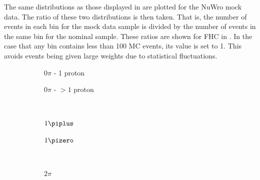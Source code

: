 The same distributions as those displayed in  are plotted for the NuWro mock data.
The ratio of these two distributions is then taken.
That is, the number of events in each bin for the mock data sample is divided by the number of events in the same bin for the nominal sample.
These ratios are shown for FHC in .
In the case that any bin contains less than \num{100} MC events, its value is set to 1.
This avoids events being given large weights due to statistical fluctuations.

\begin{figure}[t]
	\begin{subfigure}[t]{.5\linewidth}
		\begin{adjustbox}{max totalsize=\linewidth, center}
			
		\end{adjustbox}
		\caption{$0\pi$ - 1 proton}
	\end{subfigure}
	\hfill
	\begin{subfigure}[t]{.5\linewidth}
		\begin{adjustbox}{max totalsize=\linewidth, center}
			
		\end{adjustbox}
		\caption{$0\pi$ - $>1$ proton}
	\end{subfigure} \\
	\begin{subfigure}[t]{.5\linewidth}
		\begin{adjustbox}{max totalsize=\linewidth, center}
			
		\end{adjustbox}
		\caption{$1\piplus$}
	\end{subfigure}
	\hfill
	\begin{subfigure}[t]{.5\linewidth}
		\begin{adjustbox}{max totalsize=\linewidth, center}
			
		\end{adjustbox}
		\caption{$1\pizero$}
	\end{subfigure} \\
	\begin{subfigure}[t]{.5\linewidth}
		\begin{adjustbox}{max totalsize=\linewidth, center}
			
		\end{adjustbox}
		\caption{$2\pi$}
	\end{subfigure}
	\hfill
	\begin{subfigure}[t]{.5\linewidth}

\end{subfigure}
\end{figure}
